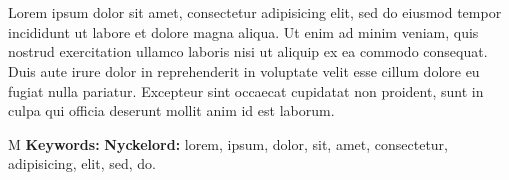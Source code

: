 
\thispagestyle{plain}			%
\section*{\abstractname}
Lorem ipsum dolor sit amet, consectetur adipisicing elit, sed do eiusmod tempor incididunt ut labore et dolore magna aliqua. Ut enim ad minim veniam, quis nostrud exercitation ullamco laboris nisi ut aliquip ex ea commodo consequat. Duis aute irure dolor in reprehenderit in voluptate velit esse cillum dolore eu fugiat nulla pariatur. Excepteur sint occaecat cupidatat non proident, sunt in culpa qui officia deserunt mollit anim id est laborum.

\vfill
\if\thesisType M
    \textbf{Keywords:}
\else
    \textbf{Nyckelord:}
\fi
lorem, ipsum, dolor, sit, amet, consectetur, adipisicing, elit, sed, do.

\if{}
\newpage				%
\thispagestyle{empty}
\mbox{}
\fi
